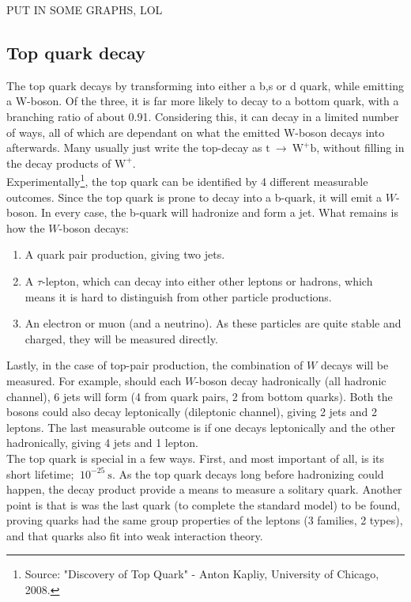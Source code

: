 \documentclass[11pt,a4paper]{article}
\begin{document}
PUT IN SOME GRAPHS, LOL

\subsection{Top quark decay}
The top quark decays by transforming into either a b,s or d quark, while emitting a W-boson. Of the three, it is far more likely to decay to a bottom quark, with a branching ratio of about 0.91. Considering this, it can decay in a limited number of ways, all of which are dependant on what the emitted W-boson decays into afterwards. Many usually just write the top-decay as $\text{t} \:\rightarrow\: \text{W}^+\text{b}$, without filling in the decay products of $\text{W}^+$.\\

Experimentally\footnote{Source: "Discovery of Top Quark" - Anton Kapliy, University of Chicago, 2008.}, the top quark can be identified by 4 different measurable outcomes. Since the top quark is prone to decay into a b-quark, it will emit a $W$-boson. In every case, the b-quark will hadronize and form a jet. What remains is how the $W$-boson decays:

\begin{enumerate}
	\item A quark pair production, giving two jets.
	\item A $\tau$-lepton, which can decay into either other leptons or hadrons, which means it is hard to distinguish from other particle productions.
	\item An electron or muon (and a neutrino). As these particles are quite stable and charged, they will be measured directly.
\end{enumerate}

Lastly, in the case of top-pair production, the combination of $W$ decays will be measured. For example, should each $W$-boson decay hadronically (all hadronic channel), 6 jets will form (4 from quark pairs, 2 from bottom quarks). Both the bosons could also decay leptonically (dileptonic channel), giving 2 jets and 2 leptons. The last measurable outcome is if one decays leptonically and the other hadronically, giving 4 jets and 1 lepton.\\

The top quark is special in a few ways. First, and most important of all, is its short lifetime; $~10^{-25}\:\text{s}$. As the top quark decays long before hadronizing could happen, the decay product provide a means to measure a solitary quark. Another point is that is was the last quark (to complete the standard model) to be found, proving quarks had the same group properties of the leptons (3 families, 2 types), and that quarks also fit into weak interaction theory.\\
\end{document}

